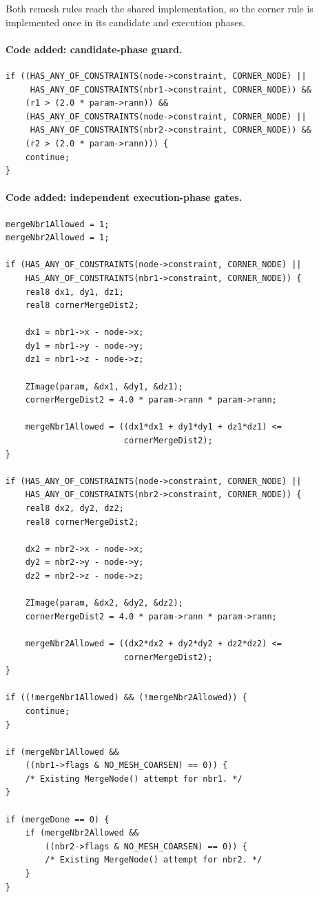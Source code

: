 \documentclass[11pt]{article}
\newcommand{\code}[1]{\texttt{\detokenize{#1}}}
\begin{document}
Both remesh rules reach the shared \code{MeshCoarsen()} implementation, so the
corner rule is implemented once in its candidate and execution phases.

\paragraph{Code added: candidate-phase guard.}

\begin{lstlisting}[style=cpp]
if ((HAS_ANY_OF_CONSTRAINTS(node->constraint, CORNER_NODE) ||
     HAS_ANY_OF_CONSTRAINTS(nbr1->constraint, CORNER_NODE)) &&
    (r1 > (2.0 * param->rann)) &&
    (HAS_ANY_OF_CONSTRAINTS(node->constraint, CORNER_NODE) ||
     HAS_ANY_OF_CONSTRAINTS(nbr2->constraint, CORNER_NODE)) &&
    (r2 > (2.0 * param->rann))) {
    continue;
}
\end{lstlisting}

\paragraph{Code added: independent execution-phase gates.}

\begin{lstlisting}[style=cpp]
mergeNbr1Allowed = 1;
mergeNbr2Allowed = 1;

if (HAS_ANY_OF_CONSTRAINTS(node->constraint, CORNER_NODE) ||
    HAS_ANY_OF_CONSTRAINTS(nbr1->constraint, CORNER_NODE)) {
    real8 dx1, dy1, dz1;
    real8 cornerMergeDist2;

    dx1 = nbr1->x - node->x;
    dy1 = nbr1->y - node->y;
    dz1 = nbr1->z - node->z;

    ZImage(param, &dx1, &dy1, &dz1);
    cornerMergeDist2 = 4.0 * param->rann * param->rann;

    mergeNbr1Allowed = ((dx1*dx1 + dy1*dy1 + dz1*dz1) <=
                        cornerMergeDist2);
}

if (HAS_ANY_OF_CONSTRAINTS(node->constraint, CORNER_NODE) ||
    HAS_ANY_OF_CONSTRAINTS(nbr2->constraint, CORNER_NODE)) {
    real8 dx2, dy2, dz2;
    real8 cornerMergeDist2;

    dx2 = nbr2->x - node->x;
    dy2 = nbr2->y - node->y;
    dz2 = nbr2->z - node->z;

    ZImage(param, &dx2, &dy2, &dz2);
    cornerMergeDist2 = 4.0 * param->rann * param->rann;

    mergeNbr2Allowed = ((dx2*dx2 + dy2*dy2 + dz2*dz2) <=
                        cornerMergeDist2);
}

if ((!mergeNbr1Allowed) && (!mergeNbr2Allowed)) {
    continue;
}

if (mergeNbr1Allowed &&
    ((nbr1->flags & NO_MESH_COARSEN) == 0)) {
    /* Existing MergeNode() attempt for nbr1. */
}

if (mergeDone == 0) {
    if (mergeNbr2Allowed &&
        ((nbr2->flags & NO_MESH_COARSEN) == 0)) {
        /* Existing MergeNode() attempt for nbr2. */
    }
}
\end{lstlisting}
\end{document}
